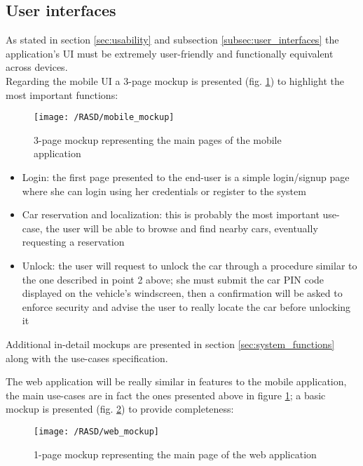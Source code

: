 \subsection{User interfaces} %
As stated in section \ref{sec:usability} and subsection \ref{subsec:user_interfaces} the application's UI must be extremely user-friendly and functionally equivalent across devices. 
\\Regarding the mobile UI a 3-page mockup is presented (fig. \ref{fig:mobile_mockup}) to highlight the most important functions: 
\begin{figure}[!ht]
	\centering
	\vspace{0.2cm}
	\texttt{[image: /RASD/mobile\_mockup]}\\ 
	\vspace{0.5cm}
	\caption{3-page mockup representing the main pages of the mobile application} \label{fig:mobile_mockup} 
\end{figure}
\begin{itemize}
	\item{Login: the first page presented to the end-user is a simple login/signup page where she can login using her credentials or register to the system}
	\item{Car reservation and localization: this is probably the most important use-case, the user will be able to browse and find nearby cars, eventually requesting a reservation}
	\item{Unlock: the user will request to unlock the car through a procedure similar to the one described in point 2 above; she must submit the car PIN code displayed on the vehicle's windscreen, then a confirmation will be asked to enforce security and advise the user to really locate the car before unlocking it}
\end{itemize}

\bigskip
Additional in-detail mockups are presented in section \ref{sec:system_functions} along with the use-cases specification.
\bigskip

The web application will be really similar in features to the mobile application, the main use-cases are in fact the ones presented above in figure \ref{fig:mobile_mockup}; a basic mockup is presented (fig. \ref{fig:web_mockup}) to provide completeness:
\begin{figure}[!ht]
	\centering
	\vspace{0.2cm}{}
	\texttt{[image: /RASD/web\_mockup]}\\ 
	\vspace{0.5cm}
	\caption{1-page mockup representing the main page of the web application} \label{fig:web_mockup} 
\end{figure}

